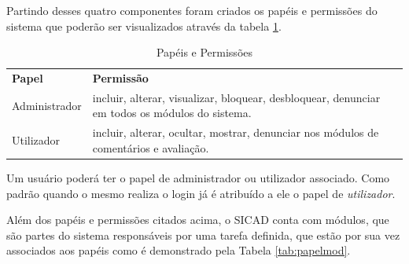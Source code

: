 \documentclass[12pt, a4paper]{report}
\begin{document}
Partindo desses quatro componentes foram criados os papéis e permissões do sistema que poderão ser visualizados através da tabela \ref{tab:papelperm}.

\begin{table}
 \centering
 {\renewcommand\arraystretch{1.25}
 \begin{tabular}{ l l }
  \cline{1-1}\cline{2-2}  
    \multicolumn{1}{|p{3.850cm}|}{\textbf{Papel} \centering } &
    \multicolumn{1}{p{4.217cm}|}{\textbf{Permissão} \centering }
  \\  
  \cline{1-1}\cline{2-2}  
    \multicolumn{1}{|p{3.850cm}|}{Administrador} &
    \multicolumn{1}{p{4.217cm}|}{incluir, alterar, visualizar, bloquear, desbloquear, denunciar em todos os módulos do sistema.}
  \\  
  \cline{1-1}\cline{2-2}  
    \multicolumn{1}{|p{3.850cm}|}{Utilizador} &
    \multicolumn{1}{p{4.217cm}|}{incluir, alterar, ocultar, mostrar, denunciar nos módulos de comentários e avaliação.}
  \\  
  \hline
 \end{tabular} }
 \caption{Papéis e Permissões}
  \label{tab:papelperm}
\end{table}

Um usuário poderá ter o papel de administrador ou utilizador associado. Como padrão quando o mesmo realiza o login já é atribuído a ele o papel de \textit{utilizador}.

Além dos papéis e permissões citados acima, o \ac{SICAD} conta com módulos, que são partes do sistema responsáveis por uma tarefa definida, que estão por sua vez associados aos papéis como é demonstrado pela Tabela \ref{tab:papelmod}.
\end{document}
